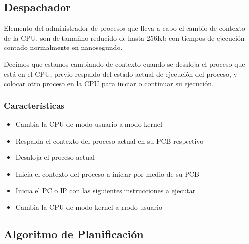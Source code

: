 \documentclass[12pt, fleqn]{report}                             %
\begin{document}
            \clearpage
            \subsection{Despachador}

                Elemento del administrador de procesos que lleva a cabo el cambio de contexto de la CPU, 
                son de tamañno reducido de hasta 256Kb con tiempos de ejecución contado normalmente en
                nanosegundo.

                Decimos que estamos cambiando de contexto cuando se desaloja el proceso que está en el CPU,
                previo respaldo del estado actual de ejecución del proceso, y colocar otro proceso en la CPU
                para iniciar o continuar su ejecución.

                \subsubsection{Características}

                \begin{itemize}
                    \item Cambia la CPU de modo usuario a modo kernel
                    \item Respalda el contexto del proceso actual en su PCB respectivo
                    \item Desaloja el proceso actual
                    \item Inicia el contexto del proceso a iniciar por medio de su PCB
                    \item Inicia el PC o IP con las siguientes instrucciones a ejecutar
                    \item Cambia la CPU de modo kernel a modo usuario
                \end{itemize}


            \clearpage
            \subsection{Algoritmo de Planificación}
\end{document}

